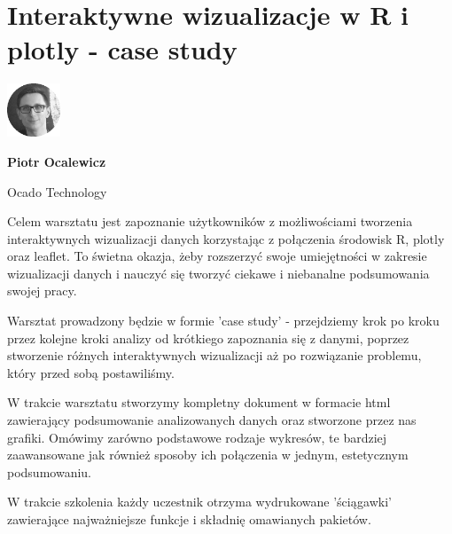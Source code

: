 \documentclass[\main/boa.tex]{subfiles}
\begin{document}
\section{Interaktywne wizualizacje w R i plotly - case study}
\begin{minipage}[t]{0.915\textwidth}
	\center     
    \includegraphics[width=60px]{img/workshops/czarno_biale/pocalewicz-crop.png} 
\end{minipage}

\begin{minipage}{0.915\textwidth}
\centering
{\bf {} Piotr Ocalewicz}
\end{minipage}

\vskip 0.3cm

\begin{affiliations}
\begin{minipage}{0.915\textwidth}
\centering
\large Ocado Technology  \\[2pt]
\end{minipage}
\end{affiliations}

\vskip 0.8cm

\opiswarsztatu Celem warsztatu jest zapoznanie użytkowników z możliwościami tworzenia interaktywnych wizualizacji danych korzystając z połączenia środowisk R, plotly oraz leaflet. To świetna okazja, żeby rozszerzyć swoje umiejętności w zakresie wizualizacji danych i nauczyć się tworzyć ciekawe i niebanalne podsumowania swojej pracy.

Warsztat prowadzony będzie w formie 'case study' - przejdziemy krok po kroku przez kolejne kroki analizy od krótkiego zapoznania się z danymi, poprzez stworzenie różnych interaktywnych wizualizacji aż po rozwiązanie problemu, który przed sobą postawiliśmy.

W trakcie warsztatu stworzymy kompletny dokument w formacie html zawierający podsumowanie analizowanych danych oraz stworzone przez nas grafiki. Omówimy zarówno podstawowe rodzaje wykresów, te bardziej zaawansowane jak również sposoby ich połączenia w jednym, estetycznym podsumowaniu.

W trakcie szkolenia każdy uczestnik otrzyma wydrukowane 'ściągawki' zawierające najważniejsze funkcje i składnię omawianych pakietów.
\end{document}
